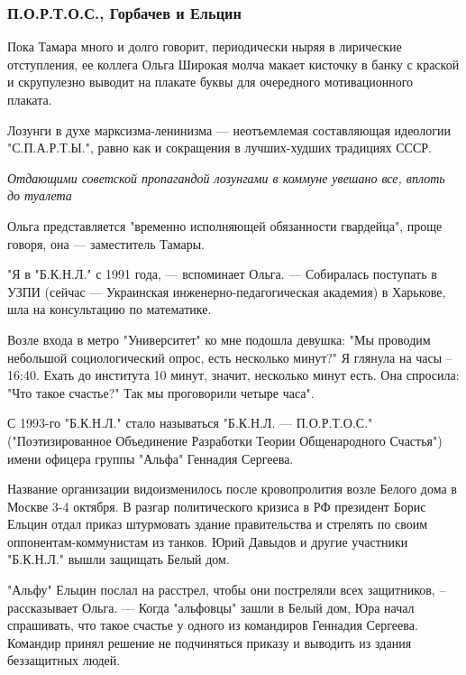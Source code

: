  
 
 

\subsubsection{П.О.Р.Т.О.С., Горбачев и Ельцин}
\label{sec:25_10_2019.news.pravda_com_ua.SPARTA.PORTOS_gorbachev_i_elcin}

Пока Тамара много и долго говорит, периодически ныряя в лирические отступления,
ее коллега Ольга Широкая молча макает кисточку в банку с краской и скрупулезно
выводит на плакате буквы для очередного мотивационного плаката. 

Лозунги в духе марксизма-ленинизма --- неотъемлемая составляющая идеологии
"С.П.А.Р.Т.Ы.", равно как и сокращения в лучших-худших традициях СССР.

\emph{Отдающими советской пропагандой лозунгами в коммуне увешано все, вплоть до туалета}

Ольга представляется "временно исполняющей обязанности гвардейца", проще
говоря, она --- заместитель Тамары.

"Я в "Б.К.Н.Л." с 1991 года, --- вспоминает Ольга. --- Собиралась поступать в УЗПИ
(сейчас --- Украинская инженерно-педагогическая академия) в Харькове, шла на
консультацию по математике. 

Возле входа в метро "Университет" ко мне подошла девушка: "Мы проводим
небольшой социологический опрос, есть несколько минут?" Я глянула на часы –
16:40. Ехать до института 10 минут, значит, несколько минут есть. Она спросила:
"Что такое счастье?" Так мы проговорили четыре часа".

С 1993-го "Б.К.Н.Л." стало называться "Б.К.Н.Л. --- П.О.Р.Т.О.С."
("Поэтизированное Объединение Разработки Теории Общенародного Счастья") имени
офицера группы "Альфа" Геннадия Сергеева. 

Название организации видоизменилось после кровопролития возле Белого дома в
Москве 3-4 октября. В разгар политического кризиса в РФ президент Борис Ельцин
отдал приказ штурмовать здание правительства и стрелять по своим
оппонентам-коммунистам из танков. Юрий Давыдов и другие участники "Б.К.Н.Л."
вышли защищать Белый дом.

"Альфу" Ельцин послал на расстрел, чтобы они постреляли всех защитников, –
рассказывает Ольга. --- Когда "альфовцы" зашли в Белый дом, Юра начал спрашивать,
что такое счастье у одного из командиров Геннадия Сергеева. Командир принял
решение не подчиняться приказу и выводить из здания беззащитных людей. 

